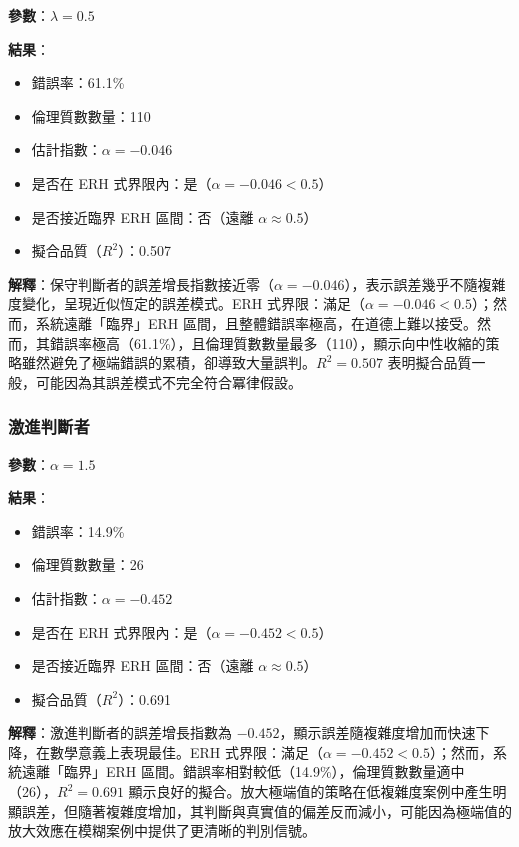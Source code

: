 \documentclass[12pt,a4paper]{article}
\theoremstyle{definition}
\theoremstyle{remark}
\begin{document}
\textbf{參數}：$\lambda = 0.5$

\textbf{結果}：
\begin{itemize}
    \item 錯誤率：61.1\%
    \item 倫理質數數量：110
    \item 估計指數：$\alpha = -0.046$
    \item 是否在 ERH 式界限內：是（$\alpha = -0.046 < 0.5$）
    \item 是否接近臨界 ERH 區間：否（遠離 $\alpha \approx 0.5$）
    \item 擬合品質（$R^2$）：0.507
\end{itemize}

\textbf{解釋}：保守判斷者的誤差增長指數接近零（$\alpha = -0.046$），表示誤差幾乎不隨複雜度變化，呈現近似恆定的誤差模式。ERH 式界限：滿足（$\alpha = -0.046 < 0.5$）；然而，系統遠離「臨界」ERH 區間，且整體錯誤率極高，在道德上難以接受。然而，其錯誤率極高（61.1\%），且倫理質數數量最多（110），顯示向中性收縮的策略雖然避免了極端錯誤的累積，卻導致大量誤判。$R^2 = 0.507$ 表明擬合品質一般，可能因為其誤差模式不完全符合冪律假設。

\subsubsection{激進判斷者}

\textbf{參數}：$\alpha = 1.5$

\textbf{結果}：
\begin{itemize}
    \item 錯誤率：14.9\%
    \item 倫理質數數量：26
    \item 估計指數：$\alpha = -0.452$
    \item 是否在 ERH 式界限內：是（$\alpha = -0.452 < 0.5$）
    \item 是否接近臨界 ERH 區間：否（遠離 $\alpha \approx 0.5$）
    \item 擬合品質（$R^2$）：0.691
\end{itemize}

\textbf{解釋}：激進判斷者的誤差增長指數為 $-0.452$，顯示誤差隨複雜度增加而快速下降，在數學意義上表現最佳。ERH 式界限：滿足（$\alpha = -0.452 < 0.5$）；然而，系統遠離「臨界」ERH 區間。錯誤率相對較低（14.9\%），倫理質數數量適中（26），$R^2 = 0.691$ 顯示良好的擬合。放大極端值的策略在低複雜度案例中產生明顯誤差，但隨著複雜度增加，其判斷與真實值的偏差反而減小，可能因為極端值的放大效應在模糊案例中提供了更清晰的判別信號。
\end{document}

